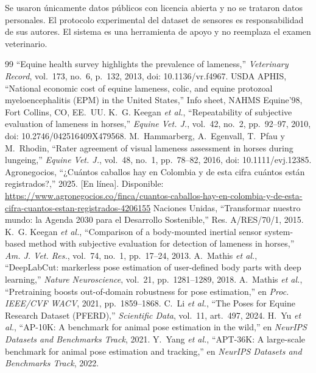 \documentclass[conference,a4paper]{IEEEtran}
\begin{document}
Se usaron únicamente datos públicos con licencia abierta y no se trataron datos personales. El protocolo experimental del dataset de sensores es responsabilidad de sus autores. El sistema es una herramienta de apoyo y no reemplaza el examen veterinario.

\begin{thebibliography}{99}
 ``Equine health survey highlights the prevalence of lameness,'' \emph{Veterinary Record}, vol.~173, no.~6, p.~132, 2013, doi: 10.1136/vr.f4967.
 USDA APHIS, ``National economic cost of equine lameness, colic, and equine protozoal myeloencephalitis (EPM) in the United States,'' Info sheet, NAHMS Equine'98, Fort Collins, CO, EE.~UU.
 K.~G. Keegan \emph{et al.}, ``Repeatability of subjective evaluation of lameness in horses,'' \emph{Equine Vet. J.}, vol.~42, no.~2, pp.~92--97, 2010, doi: 10.2746/042516409X479568.
 M.~Hammarberg, A.~Egenvall, T.~Pfau y M.~Rhodin, ``Rater agreement of visual lameness assessment in horses during lungeing,'' \emph{Equine Vet. J.}, vol.~48, no.~1, pp.~78--82, 2016, doi: 10.1111/evj.12385.
 Agronegocios, ``¿Cuántos caballos hay en Colombia y de esta cifra cuántos están registrados?,'' 2025. [En línea]. Disponible: \url{https://www.agronegocios.co/finca/cuantos-caballos-hay-en-colombia-y-de-esta-cifra-cuantos-estan-registrados-4206155}
 Naciones Unidas, ``Transformar nuestro mundo: la Agenda 2030 para el Desarrollo Sostenible,'' Res. A/RES/70/1, 2015.
 K.~G. Keegan \emph{et al.}, ``Comparison of a body-mounted inertial sensor system-based method with subjective evaluation for detection of lameness in horses,'' \emph{Am. J. Vet. Res.}, vol.~74, no.~1, pp.~17--24, 2013.
 A.~Mathis \emph{et al.}, ``DeepLabCut: markerless pose estimation of user-defined body parts with deep learning,'' \emph{Nature Neuroscience}, vol.~21, pp.~1281--1289, 2018.
 A.~Mathis \emph{et al.}, ``Pretraining boosts out-of-domain robustness for pose estimation,'' en \emph{Proc. IEEE/CVF WACV}, 2021, pp.~1859--1868.
 C.~Li \emph{et al.}, ``The Poses for Equine Research Dataset (PFERD),'' \emph{Scientific Data}, vol.~11, art.~497, 2024.
 H.~Yu \emph{et al.}, ``AP-10K: A benchmark for animal pose estimation in the wild,'' en \emph{NeurIPS Datasets and Benchmarks Track}, 2021.
 Y.~Yang \emph{et al.}, ``APT-36K: A large-scale benchmark for animal pose estimation and tracking,'' en \emph{NeurIPS Datasets and Benchmarks Track}, 2022.

\end{thebibliography}
\end{document}
